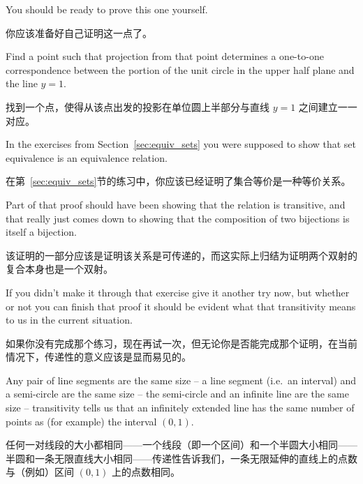 You
should be ready to prove this one yourself.

你应该准备好自己证明这一点了。

\begin{exer}
    Find a point such that projection from that point determines a
    one-to-one correspondence between the portion of the unit circle in the upper
    half plane and the line $y = 1$.
\end{exer}

\begin{exer}
    找到一个点，使得从该点出发的投影在单位圆上半部分与直线 $y = 1$ 之间建立一一对应。
\end{exer}

In the exercises from Section~\ref{sec:equiv_sets} you were supposed
to show that set
equivalence is an equivalence relation.

在第~\ref{sec:equiv_sets}节的练习中，你应该已经证明了集合等价是一种等价关系。

Part of that proof should have been
showing that the relation is transitive, and that really just comes down to
showing that the composition of two bijections is itself a bijection.

该证明的一部分应该是证明该关系是可传递的，而这实际上归结为证明两个双射的复合本身也是一个双射。

If you
didn't make it through that exercise give it another try now, but whether
or not you can finish that proof it should be evident what that transitivity
means to us in the current situation.

如果你没有完成那个练习，现在再试一次，但无论你是否能完成那个证明，在当前情况下，传递性的意义应该是显而易见的。

Any pair of line segments are the same
size -- a line segment (i.e.\ an interval) and a semi-circle are the same size --
the semi-circle and an infinite line are the same size -- transitivity tells us that
an infinitely extended line has the same number of points as (for example)
the interval $(0, 1)$.

任何一对线段的大小都相同——一个线段（即一个区间）和一个半圆大小相同——半圆和一条无限直线大小相同——传递性告诉我们，一条无限延伸的直线上的点数与（例如）区间 $(0, 1)$ 上的点数相同。

\clearpage





